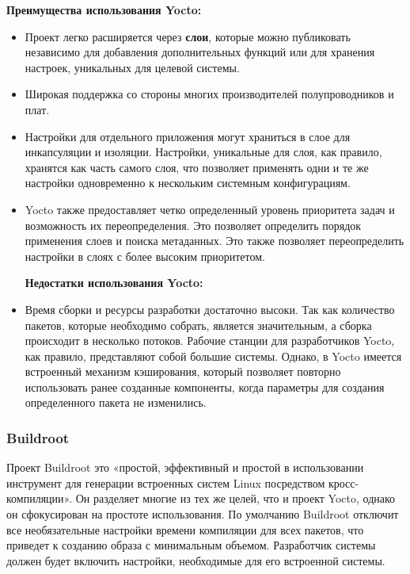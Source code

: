 \textbf{Преимущества использования Yocto:}
\begin{itemize}
  \item Проект легко расширяется через \textbf{слои}, которые можно публиковать независимо для добавления дополнительных функций или для хранения настроек, уникальных для целевой системы.
  \item Широкая поддержка со стороны многих производителей полупроводников и плат.
  \item Настройки для отдельного приложения могут храниться в слое для инкапсуляции и изоляции. Настройки, уникальные для слоя, как правило, хранятся как часть самого слоя, что позволяет применять одни и те же настройки одновременно к нескольким системным конфигурациям. 
  \item Yocto также предоставляет четко определенный уровень приоритета задач и возможность их переопределения. Это позволяет определить порядок применения слоев и поиска метаданных. Это также позволяет переопределить настройки в слоях с более высоким приоритетом.

\textbf{Недостатки использования Yocto:}
\end{itemize}
\begin{itemize}
  \item Время сборки и ресурсы разработки достаточно высоки\cite{YOCTO}. Так как количество пакетов, которые необходимо собрать, является значительным, а сборка происходит в несколько потоков. Рабочие станции для разработчиков Yocto, как правило, представляют собой большие системы. Однако, в Yocto имеется встроенный механизм кэширования, который позволяет повторно использовать ранее созданные компоненты, когда параметры для создания определенного пакета не изменились.
\end{itemize}
\newpage
\subsubsection{Buildroot}
Проект Buildroot это «простой, эффективный и простой в использовании инструмент для генерации встроенных систем Linux посредством кросс-компиляции»\cite{BUILDROOT}. 
Он разделяет многие из тех же целей, что и проект Yocto, однако он сфокусирован на простоте использования. 
По умолчанию Buildroot отключит все необязательные настройки времени компиляции для всех пакетов, что приведет к созданию образа с минимальным объемом. 
Разработчик системы должен будет включить настройки, необходимые для его встроенной системы.

